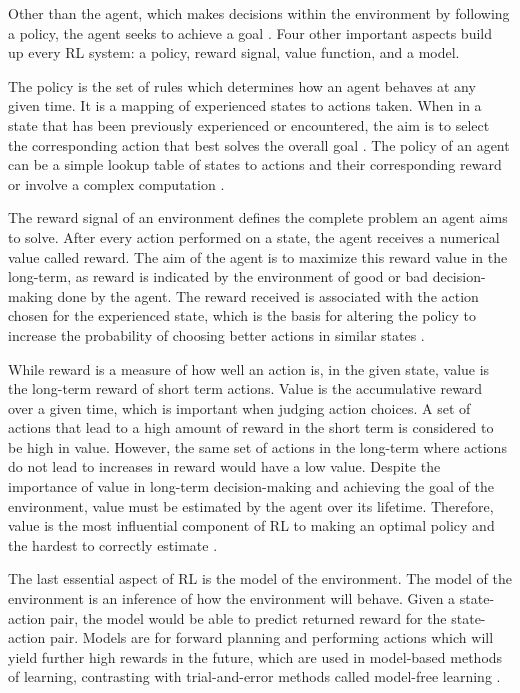 Other than the agent, which makes decisions within the environment by following a policy, the agent seeks to achieve a goal \cite{Sutton1}. Four other important aspects build up every RL system: a policy, reward signal, value function, and a model.

The policy is the set of rules which determines how an agent behaves at any given time. It is a mapping of experienced states to actions taken. When in a state that has been previously experienced or encountered, the aim is to select the corresponding action that best solves the overall goal \cite{GabrieleDe}. The policy of an agent can be a simple lookup table of states to actions and their corresponding reward or involve a complex computation \cite{Sutton1}. 

The reward signal of an environment defines the complete problem an agent aims to solve. After every action performed on a state, the agent receives a numerical value called reward. The aim of the agent is to maximize this reward value in the long-term, as reward is indicated by the environment of good or bad decision-making done by the agent. The reward received is associated with the action chosen for the experienced state, which is the basis for altering the policy to increase the probability of choosing better actions in similar states \cite{Sutton1}. 

While reward is a measure of how well an action is, in the given state, value is the long-term reward of short term actions. Value is the accumulative reward over a given time, which is important when judging action choices. A set of actions that lead to a high amount of reward in the short term is considered to be high in value. However, the same set of actions in the long-term where actions do not lead to increases in reward would have a low value. Despite the importance of value in long-term decision-making and achieving the goal of the environment, value must be estimated by the agent over its lifetime. Therefore, value is the most influential component of RL to making an optimal policy and the hardest to correctly estimate \cite{Sutton1}. 

The last essential aspect of RL is the model of the environment. The model of the environment is an inference of how the environment will behave. Given a state-action pair, the model would be able to predict returned reward for the state-action pair. Models are for forward planning and performing actions which will yield further high rewards in the future, which are used in model-based methods of learning, contrasting with trial-and-error methods called model-free learning \cite{Sutton1}.

